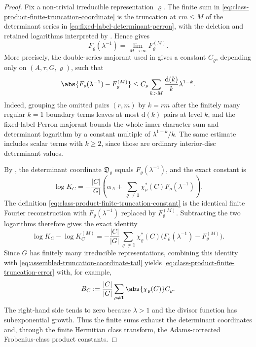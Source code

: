 \begin{proof}
  Fix a non-trivial irreducible representation \(\varrho\).  The finite sum
  in \eqref{eq:class-product-finite-truncation-coordinate} is the truncation
  at \(rm\le M\) of the determinant series in
  \eqref{eq:fixed-label-determinant-perron}, with the deletion and retained
  logarithms interpreted by
  .  Hence
  gives
  \[
    F_\varrho(\lambda^{-1})
    =\lim_{M\to\infty}F^{(M)}_\varrho .
  \]
  More precisely, the double-series majorant used in
   gives a constant
  \(C_\varrho\), depending only on \((A,\tau,G,\varrho)\), such that
  \begin{equation}\label{eq:assembled-truncation-coordinate-tail}
    \abs{F_\varrho(\lambda^{-1})-F^{(M)}_\varrho}
    \le
    C_\varrho
    \sum_{k>M}\frac{\mathrm d(k)}{k}\lambda^{1-k}.
  \end{equation}
  Indeed, grouping the omitted pairs \((r,m)\) by \(k=rm\) after the
  finitely many regular \(k=1\) boundary terms leaves at most
  \(\mathrm d(k)\) pairs at level \(k\), and the fixed-label Perron majorant
  bounds the whole inner character sum and determinant logarithm by a
  constant multiple of \(\lambda^{1-k}/k\).  The same estimate includes
  scalar terms with \(k\ge2\), since those are ordinary interior-disc
  determinant values.

  By , the determinant
  coordinate \(\mathfrak D_\varrho\) equals
  \(F_\varrho(\lambda^{-1})\), and the exact constant is
  \[
    \log K_C
    =-
    \frac{|C|}{|G|}
      \left(
        \alpha_A+
        \sum_{\varrho\ne\mathbf1}
          \chi_\varrho^\ast(C)F_\varrho(\lambda^{-1})
      \right).
  \]
  The definition \eqref{eq:class-product-finite-truncation-constant} is the
  identical finite Fourier reconstruction with
  \(F_\varrho(\lambda^{-1})\) replaced by \(F^{(M)}_\varrho\).  Subtracting
  the two logarithms therefore gives the exact identity
  \[
    \log K_C-\log K_C^{(M)}
    =-
    \frac{|C|}{|G|}
      \sum_{\varrho\ne\mathbf1}
        \chi_\varrho^\ast(C)
        \bigl(F_\varrho(\lambda^{-1})-F^{(M)}_\varrho\bigr).
  \]
  Since \(G\) has finitely many irreducible representations, combining this
  identity with \eqref{eq:assembled-truncation-coordinate-tail} yields
  \eqref{eq:class-product-finite-truncation-error} with, for example,
  \[
    B_C:=
    \frac{|C|}{|G|}
    \sum_{\varrho\ne\mathbf1}
      \abs{\chi_\varrho(C)}C_\varrho .
  \]
  The right-hand side tends to zero because \(\lambda>1\) and the divisor
  function has subexponential growth.  Thus the finite sums exhaust the
  determinant coordinates and, through the finite Hermitian class transform,
  the Adams-corrected Frobenius-class product constants.
\end{proof}

